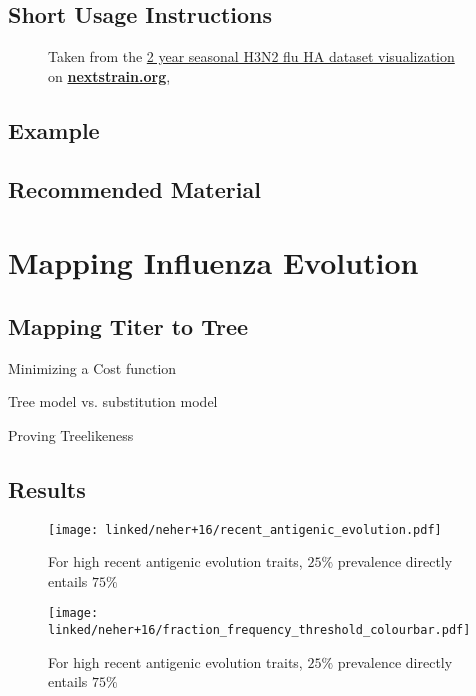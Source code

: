 \documentclass[12pt]{scrartcl}
\begin{document}
  \subsection{Short Usage Instructions}
  \begin{figure}[h!]
    \caption{\footnotesize Taken from the \href{https://nextstrain.org/flu/seasonal/h3n2/ha/2y?p=grid}{2 year seasonal H3N2 flu HA dataset visualization} on \href{https://nextstrain.org}{\textbf{nextstrain.org}}, \cite{leeMoncla+20}}
  \end{figure}


  \subsection{Example}

  \subsection{Recommended Material}

\section{Mapping Influenza Evolution}

  \subsection{Mapping Titer to Tree}

    Minimizing a Cost function

    Tree model vs. substitution model

    Proving Treelikeness

  \subsection{Results}

  \begin{figure}[h!]
    \texttt{[image: linked/neher+16/recent\_antigenic\_evolution.pdf]}
    \caption{\footnotesize For high recent antigenic evolution traits, $25\%$ prevalence directly entails $75\%$ \cite{neherBedford+16}}
  \end{figure}

  \begin{figure}[h!]
    \texttt{[image: linked/neher+16/fraction\_frequency\_threshold\_colourbar.pdf]}
    \caption{\footnotesize For high recent antigenic evolution traits, $25\%$ prevalence directly entails $75\%$ \cite{neherBedford+16}}
  \end{figure}
\end{document}
